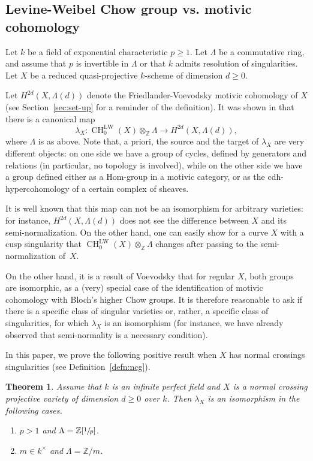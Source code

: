 \documentclass[JEP,XML,SOM,Unicode,published]{cedram}
\newcommand{\LW}{\mathrm{LW}}
\newtheorem{thm}{Theorem}[section]
\theoremstyle{definition}
\newcommand{\defref}{Definition~\ref}
\newcommand{\secref}{Section~\ref}
\newcommand{\Z}{{\mathbb Z}}
\DeclareMathOperator{\CH}{CH}
\begin{document}
\subsection{Levine-Weibel Chow group vs. motivic cohomology}
\label{sec:LWMC**}
Let $k$ be a field of exponential characteristic $p \ge 1$. Let $\Lambda$ be a commutative ring, and assume that $p$ is invertible in $\Lambda$ or that $k$ admits resolution of singularities.
Let $X$ be a reduced quasi-projective $k$-scheme of dimension $d \ge 0$.

Let $H^{2d}(X, \Lambda(d))$ denote the Friedlander-Voevodsky motivic cohomology
of $X$ (see \secref{sec:set-up} for a reminder of the definition).
It was shown in \cite{KP} that there is a canonical
map
\begin{equation}\label{eqn:LW-FS}
\lambda_X \colon \CH^{\LW}_0(X) \otimes_{\Z} \Lambda \to H^{2d}(X, \Lambda(d)),
\end{equation}
where $\Lambda$ is as above. Note that, a priori, the source and the target of $\lambda_X$ are very different objects: on one side we have a group of cycles, defined by generators and relations (in particular, no topology is involved), while on the other side we have a group defined either as a Hom-group in a motivic category, or as the cdh-hypercohomology of a certain complex of sheaves.

It is well known that this map can not be an isomorphism for arbitrary
varieties: for instance, $H^{2d}(X, \Lambda(d))$ does not
see the difference between $X$ and its semi-normalization. On the other
hand, one can easily show for a curve $X$ with a cusp singularity
that $\CH^{\LW}_0(X) \otimes_{\Z}\Lambda$ changes after passing to
the semi-normalization of~$X$.

On the other hand, it is a result of Voevodsky that for regular $X$, both groups are isomorphic, as a (very) special case of the identification of motivic cohomology with Bloch's higher Chow groups. It is therefore reasonable to ask if there is a specific class of singular varieties or, rather, a specific class of singularities, for which $\lambda_X$ is an isomorphism (for instance, we have already observed that semi-normality is a necessary condition).

In this paper, we prove the following positive result when
$X$ has normal crossings
singularities (see \defref{defn:ncg}).

\begin{thm}\label{thm:Main-6}
Assume that $k$ is an infinite perfect field
and $X$ is a normal crossing projective
variety of dimension $d \ge 0$ over $k$.
Then $\lambda_X$ is an isomorphism in the following cases.
\begin{enumerate}
\item
$p > 1$ and $\Lambda = \Z[\sfrac{1}{p}]$.
\item
$m \in k^{\times}$ and $\Lambda = {\Z}/m$.
\end{enumerate}
\end{thm}
\end{document}
